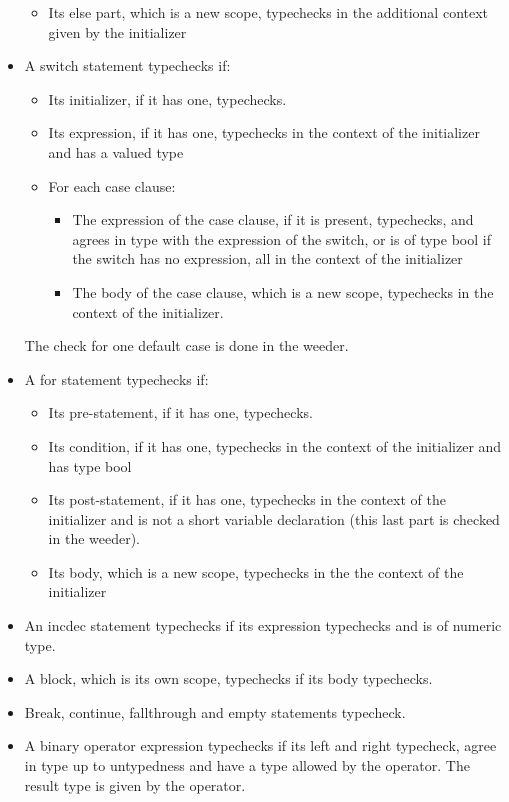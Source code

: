 \documentclass[letterpaper,11pt]{article}
\begin{document}
\begin{itemize}
\begin{itemize}
	\item Its else part, which is a new scope, typechecks in the additional context given by the initializer
	\end{itemize}
\item A switch statement typechecks if:
	\begin{itemize}
	\item Its initializer, if it has one, typechecks.
	\item Its expression, if it has one, typechecks in the context of the initializer and has a valued type
	\item For each case clause:
		\begin{itemize}
		\item The expression of the case clause, if it is present, typechecks, and agrees in type with the expression of the switch, or is of type bool if the switch has no expression, all in the context of the initializer
		\item The body of the case clause, which is a new scope, typechecks in the context of the initializer.
		\end{itemize}
	\end{itemize}
The check for one default case is done in the weeder.
\item A for statement typechecks if:
	\begin{itemize}
	\item Its pre-statement, if it has one, typechecks.
	\item Its condition, if it has one, typechecks in the context of the initializer and has type bool
	\item Its post-statement, if it has one, typechecks in the context of the initializer and is not a short variable declaration (this last part is checked in the weeder).
	\item Its body, which is a new scope, typechecks in the the context of the initializer
	\end{itemize}
\item An incdec statement typechecks if its expression typechecks and is of numeric type.
\item A block, which is its own scope, typechecks if its body typechecks.
\item Break, continue, fallthrough and empty statements typecheck.
\item A binary operator expression typechecks if its left and right typecheck, agree in type up to untypedness and have a type allowed by the operator. The result type is given by the operator.

\end{itemize}
\end{document}
